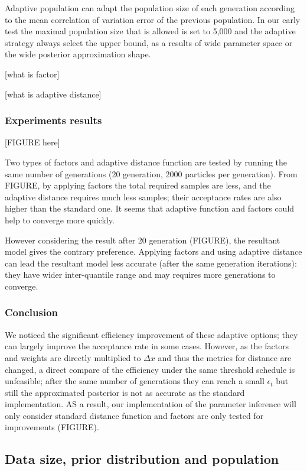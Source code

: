 \documentclass[12pt,a4paper]{report}
\begin{document}
Adaptive population \cite{ref:adpt_pop} can adapt the population size of each generation according to the mean correlation of variation error of the previous population. In our early test the maximal population size that is allowed is set to 5,000 and the adaptive strategy always select the upper bound, as a results of wide parameter space or the wide posterior approximation shape.

[what is factor]

[what is adaptive distance]

\subsubsection{Experiments results}

[FIGURE here]

Two types of factors and adaptive distance function are tested by running the same number of generations (20 generation, 2000 particles per generation). From FIGURE, by applying factors the total required samples are less, and the adaptive distance requires much less samples; their acceptance rates are also higher than the standard one. It seems that adaptive function and factors could help to converge more quickly.

However considering the result after 20 generation (FIGURE), the resultant model gives the contrary preference. Applying factors and using adaptive distance can lead the resultant model less accurate (after the same generation iterations): they have wider inter-quantile range and may requires more generations to converge.


\subsubsection{Conclusion} We noticed the significant efficiency improvement of these adaptive options; they can largely improve the acceptance rate in some cases. However, as the factors and weights are directly multiplied to $\Delta x$ and thus the metrics for distance are changed, a direct compare of the efficiency under the same threshold schedule is unfeasible; after the same number of generations they can reach a small $\epsilon_t$ but still the approximated posterior is not as accurate as the standard implementation. AS a result, our implementation of the parameter inference will only consider standard distance function and factors are only tested for improvements (FIGURE).


\subsection{Data size, prior distribution and population}
\end{document}
